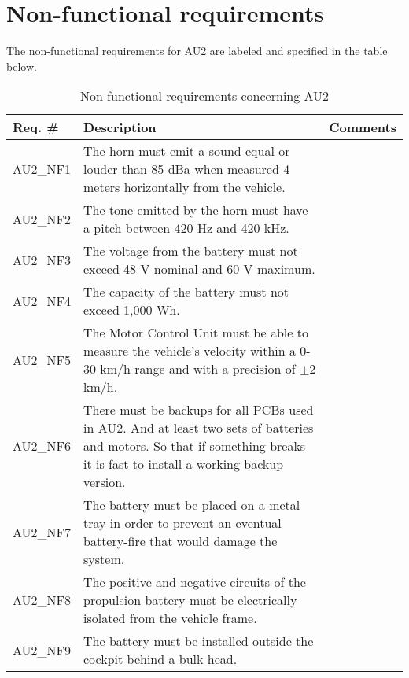\section{Non-functional requirements}
The non-functional requirements for AU2 are labeled and specified in the table below\cite{ShellRequirements}.

\begin{table}[h!]
	\centering
	\label{my-label}
	\begin{tabular}{|p{2 cm}|p{7 cm}|p{4 cm}|}
		\hline
		\textbf{Req. \#} & \textbf{Description} & \textbf{Comments} \\\hline
		AU2\_NF1	& The horn must emit a sound equal or louder than 85 dBa when measured 4 meters horizontally from the vehicle. &	\\\hline
		AU2\_NF2	& The tone emitted by the horn must have a pitch between 420 Hz and 420 kHz. &	\\\hline
		AU2\_NF3	& The voltage from the battery must not exceed 48 V nominal and 60 V maximum. &	\\\hline
		AU2\_NF4	& The capacity of the battery must not exceed 1,000 Wh. &	\\\hline
		AU2\_NF5	& The Motor Control Unit must be able to measure the vehicle's velocity within a 0-30 km/h range and with a precision of $\pm$2 km/h. &	\\\hline
		AU2\_NF6	& There must be backups for all PCBs used in AU2. And at least two sets of batteries and motors. So that if something breaks it is fast to install a working backup version. &	\\\hline
		AU2\_NF7	& The battery must be placed on a metal tray in order to prevent an eventual battery-fire that would damage the system. &   \\\hline
		AU2\_NF8	& The positive and negative circuits of the propulsion battery must be electrically isolated from the vehicle frame. &   \\\hline
		AU2\_NF9	& The battery must be installed outside the cockpit behind a bulk head. &   \\\hline
	\end{tabular}
	\caption{Non-functional requirements concerning AU2}
\end{table}
